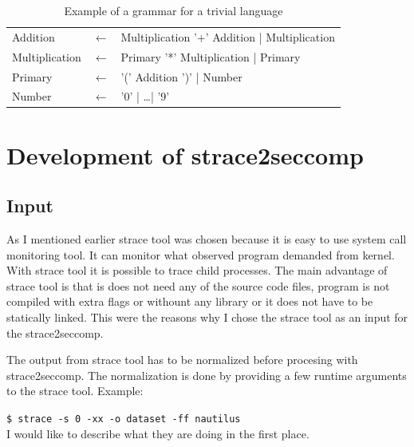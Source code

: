 \begin{table}[h]
	\begin{center}
  \begin{tabular}{lcl}
      Addition       & $\leftarrow$ & Multiplication '+' Addition | Multiplication \\
      Multiplication & $\leftarrow$ & Primary '*' Multiplication | Primary     \\
      Primary        & $\leftarrow$ & '(' Addition ')' | Number          \\
      Number        & $\leftarrow$ & '0' | \ldots | '9'
  \end{tabular}
  \end{center}
  \caption{Example of a grammar for a trivial language}
  \label{fig:pegtl:example}
\end{table}






\chapter{Development of strace2seccomp}

\section{Input}
\label{strace_params}
As I mentioned earlier strace tool was chosen because it is easy to use system
call monitoring tool. It can monitor what observed program demanded from kernel.
With strace tool it is possible to trace child processes. The main advantage of
strace tool is that is does not need any of the source code files, program is not
compiled with extra flags or withount any library or it does not have to be
statically linked. This were the reasons why I chose the strace tool as an input
for the strace2seccomp.

The output from strace tool has to be normalized before procesing with strace2seccomp.
The normalization is done by providing a few runtime arguments to the strace tool.
Example:

\texttt{\$ strace -s 0 -xx -o dataset -ff nautilus }
\\
I would like to describe what they are doing in the first place.\cite{strace_man}

